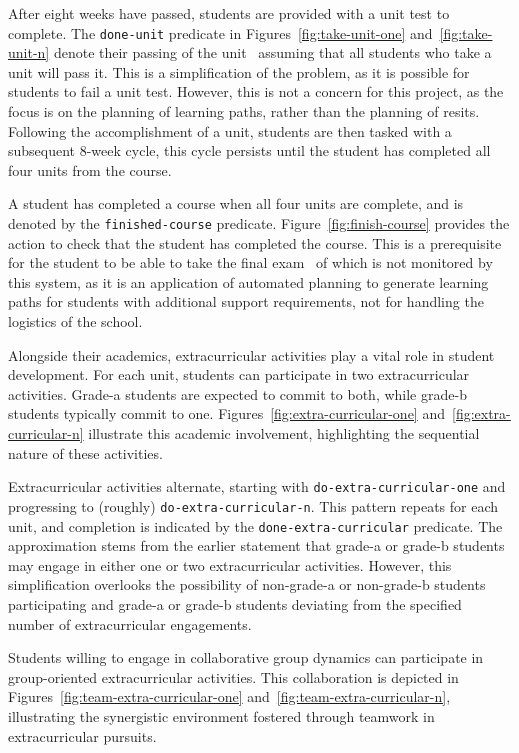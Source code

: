 After eight weeks have passed, students are provided with a unit test to complete. The \texttt{done-unit} predicate in Figures~\ref{fig:take-unit-one} and~\ref{fig:take-unit-n} denote their passing of the unit \textemdash~assuming that all students who take a unit will pass it. This is a simplification of the problem, as it is possible for students to fail a unit test. However, this is not a concern for this project, as the focus is on the planning of learning paths, rather than the planning of resits. Following the accomplishment of a unit, students are then tasked with a subsequent 8-week cycle, this cycle persists until the student has completed all four units from the course.

A student has completed a course when all four units are complete, and is denoted by the \texttt{finished-course} predicate. Figure~\ref{fig:finish-course} provides the action to check that the student has completed the course. This is a prerequisite for the student to be able to take the final exam \textemdash~of which is not monitored by this system, as it is an application of automated planning to generate learning paths for students with additional support requirements, not for handling the logistics of the school.

Alongside their academics, extracurricular activities play a vital role in student development. For each unit, students can participate in two extracurricular activities. Grade-a students are expected to commit to both, while grade-b students typically commit to one. Figures~\ref{fig:extra-curricular-one} and~\ref{fig:extra-curricular-n} illustrate this academic involvement, highlighting the sequential nature of these activities.

Extracurricular activities alternate, starting with \texttt{do-extra-curricular-one} and progressing to (roughly) \texttt{do-extra-curricular-n}. This pattern repeats for each unit, and completion is indicated by the \texttt{done-extra-curricular} predicate. The approximation stems from the earlier statement that grade-a or grade-b students may engage in either one or two extracurricular activities. However, this simplification overlooks the possibility of non-grade-a or non-grade-b students participating and grade-a or grade-b students deviating from the specified number of extracurricular engagements.

Students willing to engage in collaborative group dynamics can participate in group-oriented extracurricular activities. This collaboration is depicted in Figures~\ref{fig:team-extra-curricular-one} and~\ref{fig:team-extra-curricular-n}, illustrating the synergistic environment fostered through teamwork in extracurricular pursuits.

